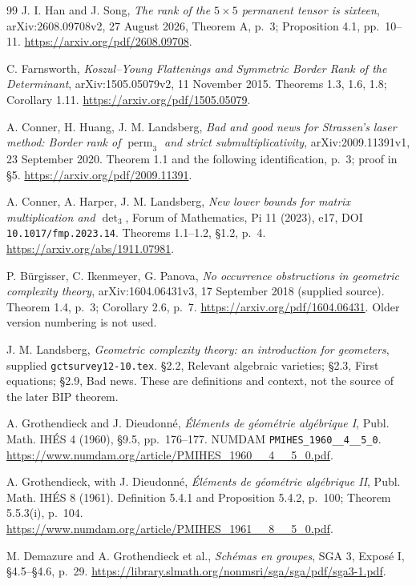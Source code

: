 \documentclass[11pt]{article}
\begin{document}
\begin{thebibliography}{99}
J. I. Han and J. Song, \emph{The rank of the $5\times5$
permanent tensor is sixteen}, arXiv:2608.09708v2,
27 August 2026, Theorem A, p.~3; Proposition 4.1, pp.~10--11.
\url{https://arxiv.org/pdf/2608.09708}.

C. Farnsworth, \emph{Koszul--Young Flattenings and Symmetric
Border Rank of the Determinant}, arXiv:1505.05079v2,
11 November 2015. Theorems 1.3, 1.6, 1.8; Corollary 1.11.
\url{https://arxiv.org/pdf/1505.05079}.

A. Conner, H. Huang, J. M. Landsberg,
\emph{Bad and good news for Strassen's laser method:
Border rank of $\operatorname{perm}_3$ and strict submultiplicativity},
arXiv:2009.11391v1, 23 September 2020.
Theorem 1.1 and the following identification, p.~3; proof in \S5.
\url{https://arxiv.org/pdf/2009.11391}.

A. Conner, A. Harper, J. M. Landsberg,
\emph{New lower bounds for matrix multiplication and $\det_3$},
Forum of Mathematics, Pi 11 (2023), e17,
DOI \texttt{10.1017/fmp.2023.14}.
Theorems 1.1--1.2, \S1.2, p.~4.
\url{https://arxiv.org/abs/1911.07981}.

P. B\"urgisser, C. Ikenmeyer, G. Panova,
\emph{No occurrence obstructions in geometric complexity theory},
arXiv:1604.06431v3, 17 September 2018 (supplied source).
Theorem 1.4, p.~3; Corollary 2.6, p.~7.
\url{https://arxiv.org/pdf/1604.06431}.
Older version numbering is not used.

J. M. Landsberg, \emph{Geometric complexity theory: an introduction
for geometers}, supplied \texttt{gctsurvey12-10.tex}.
\S2.2, Relevant algebraic varieties; \S2.3, First equations;
\S2.9, Bad news. These are definitions and context, not the
source of the later BIP theorem.

A. Grothendieck and J. Dieudonn\'e,
\emph{\'El\'ements de g\'eom\'etrie alg\'ebrique I},
Publ. Math. IH\'ES 4 (1960), \S9.5, pp.~176--177.
NUMDAM \texttt{PMIHES\_1960\_\_4\_\_5\_0}.
\url{https://www.numdam.org/article/PMIHES_1960__4__5_0.pdf}.

A. Grothendieck, with J. Dieudonn\'e,
\emph{\'El\'ements de g\'eom\'etrie alg\'ebrique II},
Publ. Math. IH\'ES 8 (1961).
Definition 5.4.1 and Proposition 5.4.2, p.~100;
Theorem 5.5.3(i), p.~104.
\url{https://www.numdam.org/article/PMIHES_1961__8__5_0.pdf}.

M. Demazure and A. Grothendieck et al.,
\emph{Sch\'emas en groupes}, SGA 3, Expos\'e I,
\S4.5--\S4.6, p.~29.
\url{https://library.slmath.org/nonmsri/sga/sga/pdf/sga3-1.pdf}.


\end{thebibliography}
\end{document}
